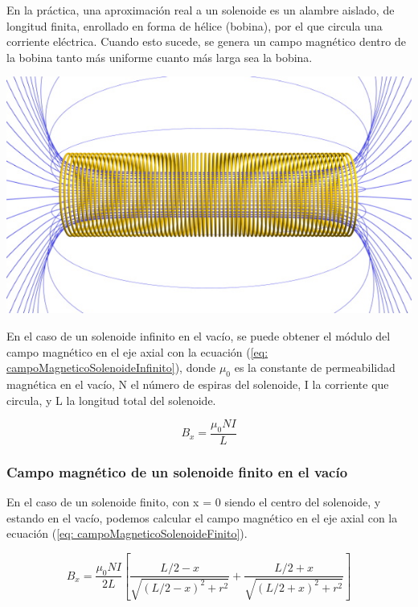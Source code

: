 \documentclass[a4paper,12pt]{article}
\newenvironment{Figure}
    {\par\medskip\noindent\minipage{\linewidth}}
    {\endminipage\par\medskip}
\begin{document}
        En la práctica, una aproximación real a un solenoide es un alambre aislado, de longitud finita, enrollado en forma de hélice (bobina), por el que circula una corriente eléctrica. Cuando esto sucede, se genera un campo magnético dentro de la bobina tanto más uniforme cuanto más larga sea la bobina.

        \begin{Figure}
            \centering

            \includegraphics[width=0.5\linewidth]{Solenoide.jpg}
            \label{fig: solenoide}
        \end{Figure}

        En el caso de un solenoide infinito en el vacío, se puede obtener el módulo del campo magnético en el eje axial con la ecuación (\ref{eq: campoMagneticoSolenoideInfinito}), donde $\mu_0$ es la constante de permeabilidad magnética en el vacío, N el número de espiras del solenoide, I la corriente que circula, y L la longitud total del solenoide.

        \begin{equation}
            \label{eq: campoMagneticoSolenoideInfinito}
            B_x = \frac{\mu_0 N I}{L}
        \end{equation}

    \subsubsection*{Campo magnético de un solenoide finito en el vacío}
    
        En el caso de un solenoide finito, con x = 0 siendo el centro del solenoide, y estando en el vacío, podemos calcular el campo magnético en el eje axial con la ecuación (\ref{eq: campoMagneticoSolenoideFinito}).

        \begin{equation}
            \label{eq: campoMagneticoSolenoideFinito}
            B_x = \frac{\mu_0 N I}{2L} \left[ \frac{L/2 - x}{\sqrt{(L/2 - x)^2 + r^2}} + \frac{L/2 + x}{\sqrt{(L/2 + x)^2 + r^2}} \right]
        \end{equation}
\end{document}
